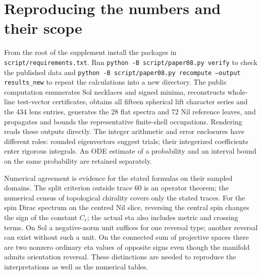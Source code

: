 \section{Reproducing the numbers and their scope}
From the root of the supplement install the packages in \texttt{script/requirements.txt}. Run \texttt{python -B script/paper08.py verify} to check the published data and \texttt{python -B script/paper08.py recompute --output results\_new} to repeat the calculations into a new directory. The public computation enumerates Sol necklaces and signed minima, reconstructs whole-line test-vector certificates, obtains all fifteen spherical lift character series and the 434 lens entries, generates the 28 flat spectra and 72 Nil reference leaves, and propagates and bounds the representative finite-shell occupations. Rendering reads these outputs directly. The integer arithmetic and error enclosures have different roles: rounded eigenvectors suggest trials; their integerized coefficients enter rigorous integrals. An ODE estimate of a probability and an interval bound on the same probability are retained separately.

Numerical agreement is evidence for the stated formulas on their sampled domains. The split criterion outside trace 60 is an operator theorem; the numerical census of topological chirality covers only the stated traces. For the spin Dirac spectrum on the centred Nil slice, reversing the central spin changes the sign of the constant \(C_r\); the actual eta also includes metric and crossing terms. On Sol a negative-norm unit suffices for one reversal type; another reversal can exist without such a unit. On the connected sum of projective spaces there are two nonzero ordinary eta values of opposite signs even though the manifold admits orientation reversal. These distinctions are needed to reproduce the interpretations as well as the numerical tables.
